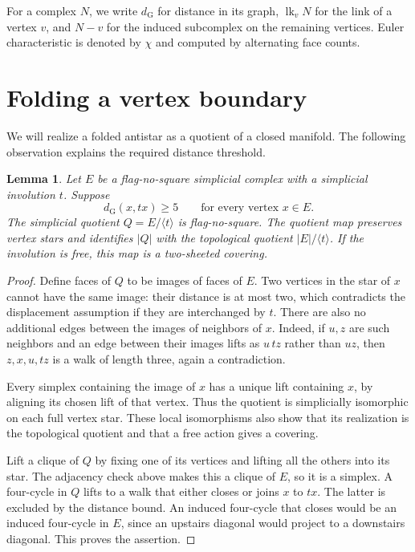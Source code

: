 \documentclass[11pt]{article}
\newtheorem{lemma}[theorem]{Lemma}
\newcommand{\lk}{\operatorname{lk}}
\newcommand{\dist}{d_{\mathrm G}}
\begin{document}
For a complex $N$, we write $\dist$ for distance in its graph,
$\lk_v N$ for the link of a vertex $v$, and $N-v$ for the induced
subcomplex on the remaining vertices. Euler characteristic is denoted
by $\chi$ and computed by alternating face counts.

\section{Folding a vertex boundary}

We will realize a folded antistar as a quotient of a closed manifold.
The following observation explains the required distance threshold.

\begin{lemma}\label{lem:quotient}
Let $E$ be a flag-no-square simplicial complex with a simplicial
involution $t$. Suppose
\[
  \dist(x,t x)\geq 5
  \qquad\text{for every vertex }x\in E.
\]
The simplicial quotient $Q=E/\langle t\rangle$ is flag-no-square.
The quotient map preserves vertex stars and identifies $|Q|$
with the topological quotient $|E|/\langle t\rangle$.
If the involution is free, this map is a two-sheeted covering.
\end{lemma}

\begin{proof}
Define faces of $Q$ to be images of faces of $E$.
Two vertices in the star of $x$ cannot have the same image:
their distance is at most two, which contradicts the displacement
assumption if they are interchanged by $t$.
There are also no additional edges between the images of neighbors of
$x$. Indeed, if $u,z$ are such neighbors and an edge between their
images lifts as $u\,t z$ rather than $uz$, then
$z,x,u,t z$ is a walk of length three, again a contradiction.

Every simplex containing the image of $x$ has a unique lift containing
$x$, by aligning its chosen lift of that vertex. Thus the quotient
is simplicially isomorphic on each full vertex star. These local
isomorphisms also show that its realization is the topological quotient
and that a free action gives a covering.

Lift a clique of $Q$ by fixing one of its vertices and lifting all
the others into its star. The adjacency check above makes this a clique
of $E$, so it is a simplex.
A four-cycle in $Q$ lifts to a walk that either closes or joins
$x$ to $t x$. The latter is excluded by the distance bound.
An induced four-cycle that closes would be an induced four-cycle
in $E$, since an upstairs diagonal would project to a downstairs
diagonal. This proves the assertion.
\end{proof}
\end{document}
